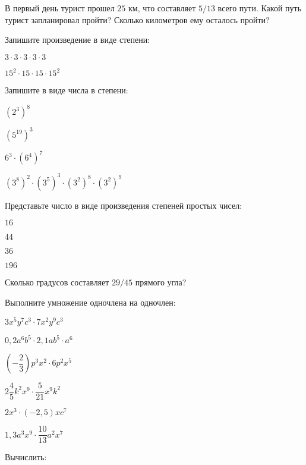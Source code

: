 \begin{listofex}
	\item В первый день турист прошел \( 25 \) км, что составляет \( 5/13 \) всего пути. Какой путь турист запланировал пройти? Сколько километров ему осталось пройти?
	\item Запишите произведение в виде степени:
	\begin{enumcols}[itemcolumns=2]
		\item \( 3\cdot3\cdot3\cdot3\cdot3 \)
		\item \( 15^2\cdot15\cdot15\cdot15^2 \)
	\end{enumcols}
	\item Запишите в виде числа в степени:
	\begin{enumcols}[itemcolumns=3]
		\item \( (2^3)^8 \)
		\item \( (5^{19})^{3} \)
		\item \( 6^3\cdot(6^4)^{7} \)
		\item \( (3^8)^2\cdot(3^5)^3\cdot(3^2)^8\cdot(3^2)^9 \)
	\end{enumcols}
	\item Представьте число в виде произведения степеней простых чисел:
	\begin{enumcols}[itemcolumns=4]
		\item \( 16 \)
		\item \( 44 \)
		\item \( 36 \)
		\item \( 196 \)
	\end{enumcols}
	\item Сколько градусов составляет \( 29/45 \) прямого угла?
	\item Выполните умножение одночлена на одночлен:
	\begin{enumcols}[itemcolumns=2]
		\item \( 3x^5y^7c^3\cdot7x^2y^9c^3 \)
		\item \( 0,2a^6b^5\cdot2,1ab^5\cdot a^6 \)
		\item \( \left( -\dfrac{2}{3} \right)p^3x^2\cdot6p^2x^5 \)
		\item \( 2\dfrac{4}{5}k^2x^9\cdot\dfrac{5}{21}x^9k^2 \)
		\item \( 2x^3\cdot\left( -2,5 \right)xc^7 \)
		\item \( 1,3a^3x^9\cdot\dfrac{10}{13}a^2x^7 \)
	\end{enumcols}
	\item Вычислить:
	\begin{enumcols}[itemcolumns=4]

\end{enumcols}
\end{listofex}
